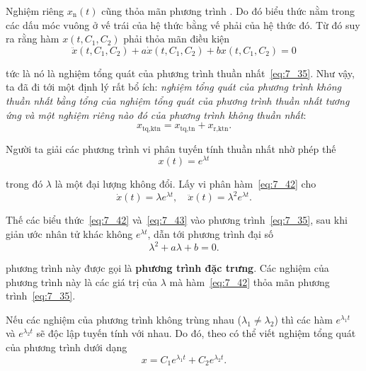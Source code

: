 Nghiệm riêng $x_{\text{n}}(t)$ cũng thỏa mãn phương trình . Do đó biểu thức nằm trong các dấu móc vuông ở vế trái của hệ thức  bằng vế phải của hệ thức đó. Từ đó suy ra rằng hàm $x(t, C_1, C_2)$ phải thỏa mãn điều kiện
\begin{equation*}
	\ddot{x}(t, C_1, C_2) + a\dot{x}(t, C_1, C_2) + bx(t, C_1, C_2) = 0
\end{equation*}

\noindent
tức là nó là nghiệm tổng quát của phương trình thuần nhất~\eqref{eq:7_35}. Như vậy, ta đã đi tới một định lý rất bổ ích: \textit{nghiệm tổng quát của phương trình không thuần nhất bằng tổng của nghiệm tổng quát của phương trình thuần nhất tương ứng và một nghiệm riêng nào đó của phương trình không thuần nhất}:
\begin{equation}\label{eq:7_41}
	x_{\text{tq,ktn}} = x_{\text{tq,tn}} + x_{\text{r,ktn}}.
\end{equation}

\noindent
Người ta giải các phương trình vi phân tuyến tính thuần nhất nhờ phép thế
\begin{equation}\label{eq:7_42}
	x(t) = e^{\lambda t}
\end{equation}

\noindent
trong đó $\lambda$ là một đại lượng không đổi. Lấy vi phân hàm~\eqref{eq:7_42} cho
\begin{equation}\label{eq:7_43}
	\dot{x}(t) = \lambda e^{\lambda t},\quad \ddot{x}(t) = \lambda^2 e^{\lambda t}.
\end{equation}

\noindent
Thế các biểu thức~\eqref{eq:7_42} và~\eqref{eq:7_43} vào phương trình~\eqref{eq:7_35}, sau khi giản ước nhân tử khác không $e^{\lambda t}$, dẫn tới phương trình đại số
\begin{equation}\label{eq:7_44}
	\lambda^2 + a\lambda + b = 0.
\end{equation}

\noindent
phương trình này được gọi là \textbf{phương trình đặc trưng}. Các nghiệm của phương trình này là các giá trị của $\lambda$ mà hàm~\eqref{eq:7_42} thỏa mãn phương trình~\eqref{eq:7_35}.

Nếu các nghiệm của phương trình  không trùng nhau ($\lambda_1\neq\lambda_2$) thì các hàm $e^{\lambda_1 t}$ và $e^{\lambda_2 t}$ sẽ độc lập tuyến tính với nhau. Do đó, theo  có thể viết nghiệm tổng quát của phương trình dưới dạng
\begin{equation}\label{eq:7_45}
	x = C_1 e^{\lambda_1 t} + C_2 e^{\lambda_2 t}.
\end{equation}

